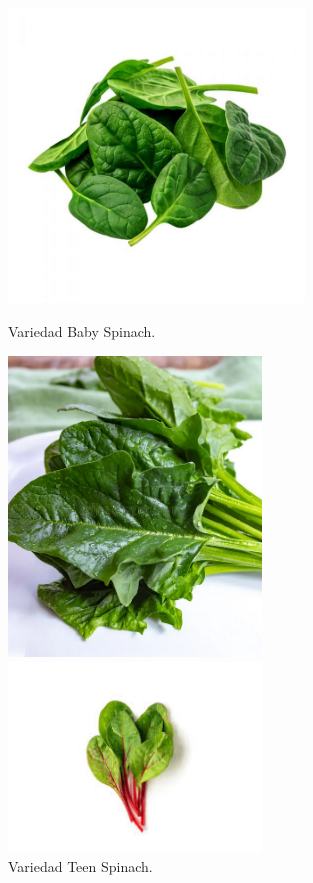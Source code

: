 \begin{figure}[ht!]
    \centering

    \begin{minipage}[b]{0.45\textwidth}
        \centering
        \includegraphics[width=0.7\textwidth]{img/baby_spinach.png}
        \caption{Variedad Baby Spinach.}
        \label{fig:baby}
    \end{minipage}
    \hfill
    \begin{minipage}[b]{0.45\textwidth}
        \centering
        \includegraphics[width=0.6\textwidth]{img/teen_spinach.png}
        \caption{Variedad Teen Spinach.}
        \label{fig:teen}
    \end{minipage}
    \begin{minipage}[b]{0.45\textwidth}
        \centering
        \includegraphics[width=0.6\textwidth]{img/red_spinach.jpg}

\end{minipage}
\end{figure}
